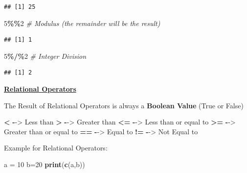 \documentclass[
]{article}
\newenvironment{Shaded}{\begin{snugshade}}{\end{snugshade}}
\newcommand{\CommentTok}[1]{\textcolor[rgb]{0.56,0.35,0.01}{\textit{#1}}}
\newcommand{\DecValTok}[1]{\textcolor[rgb]{0.00,0.00,0.81}{#1}}
\newcommand{\FunctionTok}[1]{\textcolor[rgb]{0.13,0.29,0.53}{\textbf{#1}}}
\newcommand{\NormalTok}[1]{#1}
\newcommand{\OtherTok}[1]{\textcolor[rgb]{0.56,0.35,0.01}{#1}}
\newcommand{\SpecialCharTok}[1]{\textcolor[rgb]{0.81,0.36,0.00}{\textbf{#1}}}
\begin{document}
\begin{verbatim}
## [1] 25
\end{verbatim}

\begin{Shaded}
\begin{Highlighting}[]
\DecValTok{5}\SpecialCharTok{\%\%}\DecValTok{2} \CommentTok{\# Modulus (the remainder will be the result)}
\end{Highlighting}
\end{Shaded}

\begin{verbatim}
## [1] 1
\end{verbatim}

\begin{Shaded}
\begin{Highlighting}[]
\DecValTok{5}\SpecialCharTok{\%/\%}\DecValTok{2} \CommentTok{\# Integer Division}
\end{Highlighting}
\end{Shaded}

\begin{verbatim}
## [1] 2
\end{verbatim}

\ul{\textbf{Relational Operators}}

The Result of Relational Operators is always a \textbf{Boolean Value}
(True or False)

\begin{Shaded}
\begin{Highlighting}[]
\SpecialCharTok{\textless{}}  \SpecialCharTok{{-}}\OtherTok{{-}\textgreater{}}\NormalTok{ Less than }
\SpecialCharTok{\textgreater{}}  \SpecialCharTok{{-}}\OtherTok{{-}\textgreater{}}\NormalTok{ Greater than}
\SpecialCharTok{\textless{}=} \SpecialCharTok{{-}}\OtherTok{{-}\textgreater{}}\NormalTok{ Less than or equal to}
\SpecialCharTok{\textgreater{}=} \SpecialCharTok{{-}}\OtherTok{{-}\textgreater{}}\NormalTok{ Greater than or equal to}
\SpecialCharTok{==} \SpecialCharTok{{-}}\OtherTok{{-}\textgreater{}}\NormalTok{ Equal to }
\SpecialCharTok{!=} \SpecialCharTok{{-}}\OtherTok{{-}\textgreater{}}\NormalTok{ Not Equal to }
\end{Highlighting}
\end{Shaded}

Example for Relational Operators:

\begin{Shaded}
\begin{Highlighting}[]
\NormalTok{a }\OtherTok{=} \DecValTok{10}
\NormalTok{b}\OtherTok{=}\DecValTok{20}
\FunctionTok{print}\NormalTok{(}\FunctionTok{c}\NormalTok{(a,b))}
\end{Highlighting}
\end{Shaded}
\end{document}
